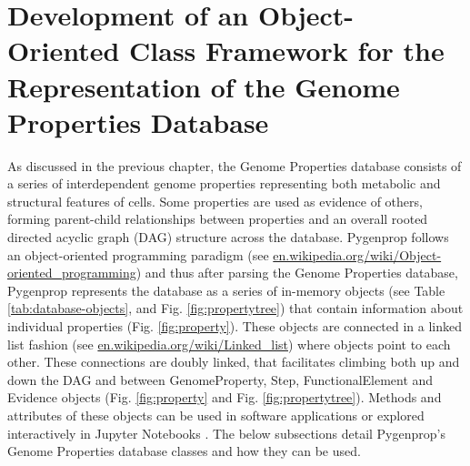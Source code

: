 \section{Development of an Object-Oriented Class Framework for the Representation of the Genome Properties Database} \label{genomeprop-oop}

As discussed in the previous chapter, the Genome Properties database consists of a series of interdependent genome properties representing both metabolic and structural features of cells. Some properties are used as evidence of others, forming parent-child relationships between properties and an overall rooted directed acyclic graph (DAG) structure across the database. Pygenprop follows an object-oriented programming paradigm \cite{booch1986object} (see \href{en.wikipedia.org/wiki/Object-oriented\_programming}{en.wikipedia.org/wiki/Object-oriented\_programming}) and thus after parsing the Genome Properties database, Pygenprop represents the database as a series of in-memory objects (see Table \ref{tab:database-objects}, and Fig. \ref{fig:propertytree}) that contain information about individual properties (Fig. \ref{fig:property}). These objects are connected in a linked list fashion \cite{newell1957programming} (see \href{en.wikipedia.org/wiki/Linked\_list}{en.wikipedia.org/wiki/Linked\_list}) where objects point to each other. These connections are doubly linked, that facilitates climbing both up and down the DAG and between GenomeProperty, Step, FunctionalElement and Evidence objects (Fig. \ref{fig:property} and Fig. \ref{fig:propertytree}). Methods and attributes of these objects can be used in software applications or explored interactively in Jupyter Notebooks \cite{kluyver2016jupyter}. The below subsections detail Pygenprop's Genome Properties database classes and how they can be used. 


